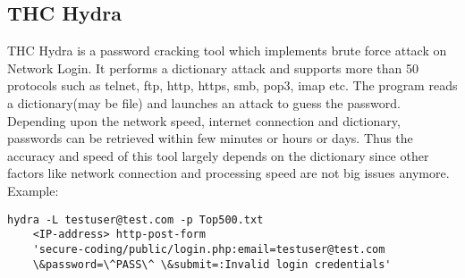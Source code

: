\subsection{THC Hydra}
THC Hydra is a password cracking tool which implements brute force attack on Network Login. It performs a dictionary attack and supports more than 50 protocols such as telnet, ftp, http, https, smb, pop3, imap etc. The program reads a dictionary(may be file) and launches an attack to guess the password. Depending upon the network speed, internet connection and dictionary, passwords can be retrieved within few minutes or hours or days. Thus the accuracy and speed of this tool largely depends on the dictionary since other factors like network connection and processing speed are not big issues anymore. \\
Example:

\begin{lstlisting}
hydra -L testuser@test.com -p Top500.txt
    <IP-address> http-post-form
    'secure-coding/public/login.php:email=testuser@test.com
    \&password=\^PASS\^ \&submit=:Invalid login credentials'
\end{lstlisting}